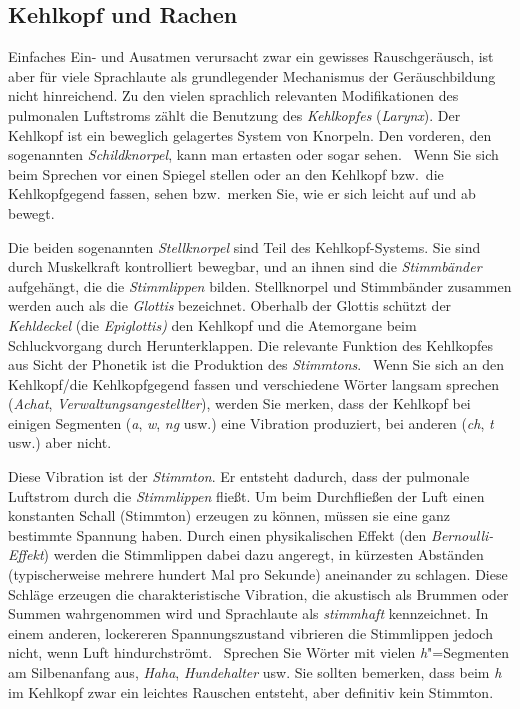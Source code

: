 \subsection{Kehlkopf und Rachen}
\label{sec:kehlkopfundrachen}

Einfaches Ein- und Ausatmen verursacht zwar ein gewisses Rauschgeräusch, ist aber für viele Sprachlaute als grundlegender Mechanismus der Geräuschbildung nicht hinreichend.
Zu den vielen sprachlich relevanten Modifikationen des pulmonalen Luftstroms zählt die Benutzung des \textit{Kehlkopfes} (\textit{Larynx}).
Der Kehlkopf ist ein beweglich gelagertes System von Knorpeln.
Den vorderen, den sogenannten \textit{Schildknorpel}, kann man ertasten oder sogar sehen.
\TuBegin~Wenn Sie sich beim Sprechen vor einen Spiegel stellen oder an den Kehlkopf bzw.\ die Kehlkopfgegend fassen, sehen bzw.\ merken Sie, wie er sich leicht auf und ab bewegt.

Die beiden sogenannten \textit{Stellknorpel} sind Teil des Kehlkopf-Systems.
Sie sind durch Muskelkraft kontrolliert bewegbar, und an ihnen sind die \textit{Stimmbänder} aufgehängt, die die \textit{Stimmlippen} bilden.
Stellknorpel und Stimmbänder zusammen werden auch als die \textit{Glottis} bezeichnet.
Oberhalb der Glottis schützt der \textit{Kehldeckel} (die \textit{Epiglottis)} den Kehlkopf und die Atemorgane beim Schluckvorgang durch Herunterklappen.
Die relevante Funktion des Kehlkopfes aus Sicht der Phonetik ist die Produktion des \textit{Stimmtons}.
\TuBegin~Wenn Sie sich an den Kehlkopf/die Kehlkopfgegend fassen und verschiedene Wörter langsam sprechen (\zB \textit{Achat}, \textit{Verwaltungsangestellter}), werden Sie merken, dass der Kehlkopf bei einigen Segmenten (\textit{a}, \textit{w}, \textit{ng} usw.) eine Vibration produziert, bei anderen (\textit{ch}, \textit{t} usw.) aber nicht.

Diese Vibration ist der \textit{Stimmton}.
Er entsteht dadurch, dass der pulmonale Luftstrom durch die \textit{Stimmlippen} fließt.
Um beim Durchfließen der Luft einen konstanten Schall (Stimmton) erzeugen zu können, müssen sie eine ganz bestimmte Spannung haben.
Durch einen physikalischen Effekt (den \textit{Bernoulli-Effekt}) werden die Stimmlippen dabei dazu angeregt, in kürzesten Abständen (typischerweise mehrere hundert Mal pro Sekunde) aneinander zu schlagen.
Diese Schläge erzeugen die charakteristische Vibration, die akustisch als Brummen oder Summen wahrgenommen wird und Sprachlaute als \textit{stimmhaft} kennzeichnet.
In einem anderen, lockereren Spannungszustand vibrieren die Stimmlippen jedoch nicht, wenn Luft hindurchströmt.
\TuBegin~Sprechen Sie Wörter mit vielen \textit{h}"=Segmenten am Silbenanfang aus, \zB \textit{Haha}, \textit{Hundehalter} usw.
Sie sollten bemerken, dass beim \textit{h} im Kehlkopf zwar ein leichtes Rauschen entsteht, aber definitiv kein Stimmton.

